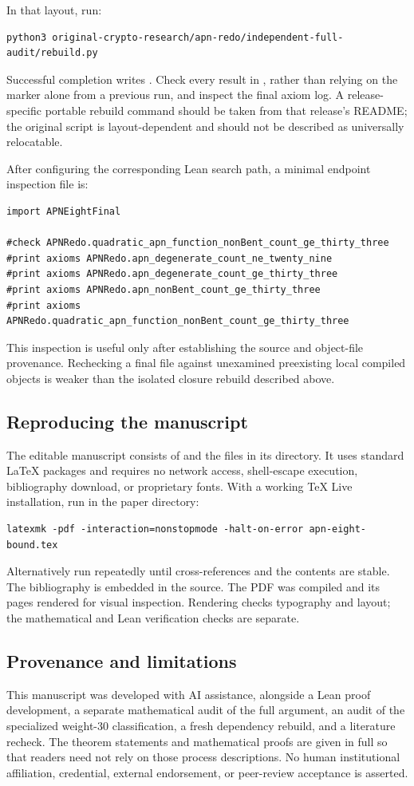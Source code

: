 In that layout, run:
\begin{lstlisting}
python3 original-crypto-research/apn-redo/independent-full-audit/rebuild.py
\end{lstlisting}
Successful completion writes . Check every result in , rather than relying on the marker alone from a previous run, and inspect the final axiom log. A release-specific portable rebuild command should be taken from that release's README; the original script is layout-dependent and should not be described as universally relocatable.

After configuring the corresponding Lean search path, a minimal endpoint inspection file is:
\begin{lstlisting}
import APNEightFinal

#check APNRedo.quadratic_apn_function_nonBent_count_ge_thirty_three
#print axioms APNRedo.apn_degenerate_count_ne_twenty_nine
#print axioms APNRedo.apn_degenerate_count_ge_thirty_three
#print axioms APNRedo.apn_nonBent_count_ge_thirty_three
#print axioms APNRedo.quadratic_apn_function_nonBent_count_ge_thirty_three
\end{lstlisting}
This inspection is useful only after establishing the source and object-file provenance. Rechecking a final file against unexamined preexisting local compiled objects is weaker than the isolated closure rebuild described above.

\subsection{Reproducing the manuscript}
The editable manuscript consists of  and the files in its  directory. It uses standard LaTeX packages and requires no network access, shell-escape execution, bibliography download, or proprietary fonts. With a working TeX Live installation, run in the paper directory:
\begin{lstlisting}
latexmk -pdf -interaction=nonstopmode -halt-on-error apn-eight-bound.tex
\end{lstlisting}
Alternatively run  repeatedly until cross-references and the contents are stable. The bibliography is embedded in the source. The PDF was compiled and its pages rendered for visual inspection. Rendering checks typography and layout; the mathematical and Lean verification checks are separate.

\subsection{Provenance and limitations}
This manuscript was developed with AI assistance, alongside a Lean proof development, a separate mathematical audit of the full argument, an audit of the specialized weight-$30$ classification, a fresh dependency rebuild, and a literature recheck. The theorem statements and mathematical proofs are given in full so that readers need not rely on those process descriptions. No human institutional affiliation, credential, external endorsement, or peer-review acceptance is asserted.

